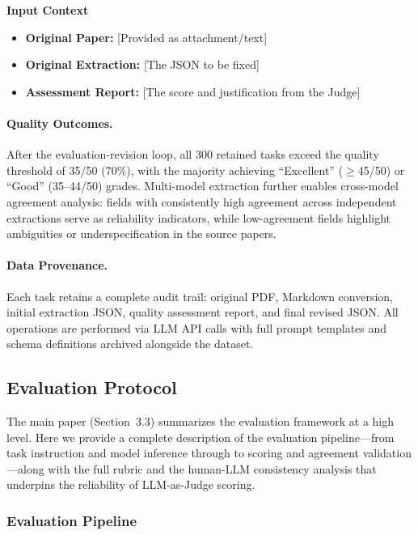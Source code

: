 \begin{tcolorbox}[
	title={Box 5: Revision Prompt Template},
	colback=blue!3!white,
	colframe=blue!30!black,
	colbacktitle=blue!15!white,
	coltitle=black,
	fonttitle=\bfseries,
	arc=3mm,
	boxrule=0.8pt,
	breakable
]
\medskip
\textbf{Input Context}
\begin{itemize}[nosep,leftmargin=12pt]
	\item \textbf{Original Paper:} [Provided as attachment/text]
	\item \textbf{Original Extraction:} [The JSON to be fixed]
	\item \textbf{Assessment Report:} [The score and justification from the Judge]
\end{itemize}
\end{tcolorbox}

\paragraph{Quality Outcomes.}
After the evaluation-revision loop, all 300 retained tasks exceed the quality threshold of 35/50 (70\%), with the majority achieving ``Excellent'' ($\geq$45/50) or ``Good'' (35--44/50) grades. Multi-model extraction further enables cross-model agreement analysis: fields with consistently high agreement across independent extractions serve as reliability indicators, while low-agreement fields highlight ambiguities or underspecification in the source papers.

\paragraph{Data Provenance.}
Each task retains a complete audit trail: original PDF, Markdown conversion, initial extraction JSON, quality assessment report, and final revised JSON. All operations are performed via LLM API calls with full prompt templates and schema definitions archived alongside the dataset.

\subsection{Evaluation Protocol}

The main paper (Section~3.3) summarizes the evaluation framework at a high level. Here we provide a complete description of the evaluation pipeline---from task instruction and model inference through to scoring and agreement validation---along with the full rubric and the human-LLM consistency analysis that underpins the reliability of LLM-as-Judge scoring.

\subsubsection{Evaluation Pipeline}

